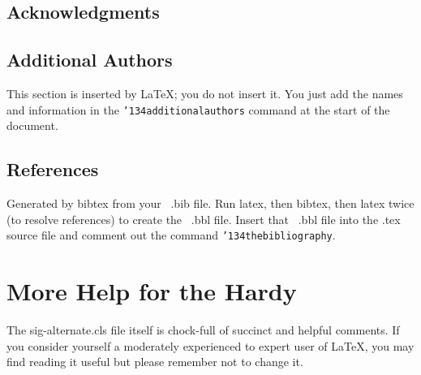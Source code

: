 \documentclass{sig-alternate}
\begin{document}
\subsection{Acknowledgments}
\subsection{Additional Authors}
This section is inserted by \LaTeX; you do not insert it.
You just add the names and information in the
\texttt{{\char'134}additionalauthors} command at the start
of the document.
\subsection{References}
Generated by bibtex from your ~.bib file.  Run latex,
then bibtex, then latex twice (to resolve references)
to create the ~.bbl file.  Insert that ~.bbl file into
the .tex source file and comment out
the command \texttt{{\char'134}thebibliography}.
\section{More Help for the Hardy}
The sig-alternate.cls file itself is chock-full of succinct
and helpful comments.  If you consider yourself a moderately
experienced to expert user of \LaTeX, you may find reading
it useful but please remember not to change it.
\end{document}
